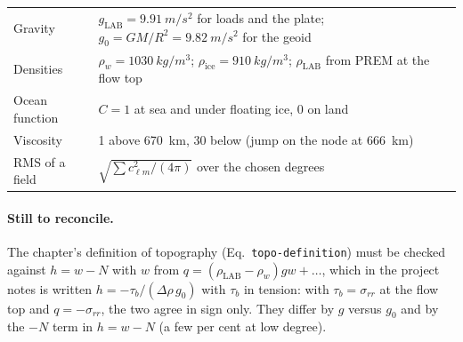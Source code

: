 \begin{center}
\begin{longtable}{p{}p{}}
Gravity & $g_{\mathrm{LAB}} = \qty{9.91}{m/s^2}$ for loads and the plate; $g_0 = GM/R^2 = \qty{9.82}{m/s^2}$ for the geoid\\
Densities & $\rho_w = \qty{1030}{kg/m^3}$; $\rho_{\mathrm{ice}} = \qty{910}{kg/m^3}$; $\rho_{\mathrm{LAB}}$ from PREM at the flow top\\
Ocean function & $C=1$ at sea and under floating ice, 0 on land\\
Viscosity & 1 above \qty{670}{km}, 30 below (jump on the node at \qty{666}{km})\\
RMS of a field & $\sqrt{\sum c_{\ell m}^2/(4\pi)}$ over the chosen degrees\\
\bottomrule
\end{longtable}
\end{center}

\paragraph{Still to reconcile.}
The chapter's definition of topography (Eq.~\texttt{topo-definition}) must be checked against $h = w - N$ with $w$ from $q = (\rho_{\mathrm{LAB}}-\rho_w)gw + \dots$, which in the project notes is written $h = -\tau_b/(\Delta\rho\,g_0)$ with $\tau_b$ in tension: with $\tau_b = \sigma_{rr}$ at the flow top and $q=-\sigma_{rr}$, the two agree in sign only. They differ by $g$ versus $g_0$ and by the $-N$ term in $h=w-N$ (a few per cent at low degree).
